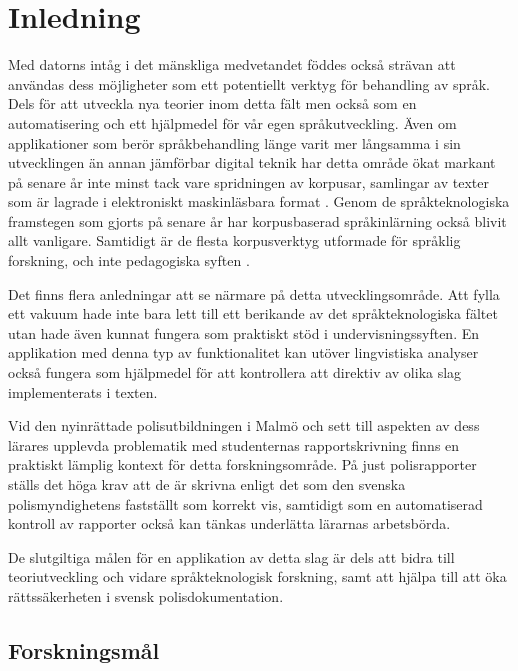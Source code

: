\documentclass[swedish]{maucsthesis}
\begin{document}
\ifodd\value{page}\else\mbox{}\newpage\fi
\tableofcontents
\newpage
\startpagecount

\section{Inledning}
Med datorns intåg i det mänskliga medvetandet föddes också strävan att användas
dess möjligheter som ett potentiellt verktyg för behandling av språk. Dels för
att utveckla nya teorier inom detta fält men också som en automatisering och ett
hjälpmedel för vår egen språkutveckling. Även om applikationer som berör
språkbehandling länge varit mer långsamma i sin utvecklingen än annan jämförbar
digital teknik har detta område ökat markant på senare år inte minst tack vare
spridningen av korpusar, samlingar av texter som är lagrade i elektroniskt
maskinläsbara format \citep{nugues:2014}. Genom de språkteknologiska framstegen
som gjorts på senare år har korpusbaserad språkinlärning också blivit allt
vanligare. Samtidigt är de flesta korpusverktyg utformade för språklig
forskning, och inte pedagogiska syften \citep{zhu:2015}.

Det finns flera anledningar att se närmare på detta utvecklingsområde. Att fylla
ett vakuum hade inte bara lett till ett berikande av det språkteknologiska
fältet utan hade även kunnat fungera som praktiskt stöd i undervisningssyften.
En applikation med denna typ av funktionalitet kan utöver lingvistiska analyser
också fungera som hjälpmedel för att kontrollera att direktiv av olika slag
implementerats i texten.

Vid den nyinrättade polisutbildningen i Malmö och sett till aspekten av dess
lärares upplevda problematik med studenternas rapportskrivning finns en
praktiskt lämplig kontext för detta forskningsområde. På just polisrapporter
ställs det höga krav att de är skrivna enligt det som den svenska
polismyndighetens fastställt som korrekt vis, samtidigt som en automatiserad
kontroll av rapporter också kan tänkas underlätta lärarnas arbetsbörda.

De slutgiltiga målen för en applikation av detta slag är dels att bidra till
teoriutveckling och vidare språkteknologisk forskning, samt att hjälpa till att
öka rättssäkerheten i svensk polisdokumentation.

\subsection{Forskningsmål}
\end{document}
